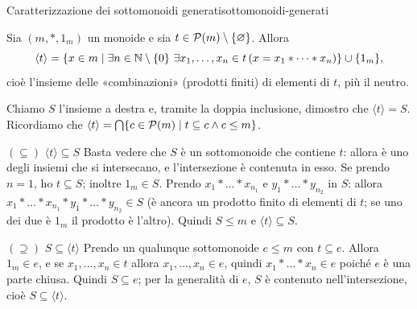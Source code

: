 \begin{concetto}
\begin{Teorema}{Caratterizzazione dei sottomonoidi generati}{sottomonoidi-generati}
    \begin{prerequisiti}
    \end{prerequisiti}
    Sia $(m, *, 1_m)$ un monoide e sia $t \in \mathcal{P}(m) \setminus \{\varnothing\}$. Allora
    \[ \langle t \rangle = \{x \in m \mid \exists n \in \mathbb{N} \setminus \{0\}\ \exists x_1, \dots, x_n \in t\,(x = x_1 * \dots * x_n)\} \cup \{1_m\}, \]
    cioè l'insieme delle «combinazioni» (prodotti finiti) di elementi di $t$, più il neutro.
\end{Teorema}
\begin{dimostrazione}
    Chiamo $S$ l'insieme a destra e, tramite la doppia inclusione, dimostro che $\langle t \rangle = S$. Ricordiamo che
    $\langle t \rangle = \bigcap\{c \in \mathcal{P}(m) \mid t \subseteq c \wedge c \leq m\}$.
    \begin{caso}{$(\subseteq)$ $\langle t \rangle \subseteq S$}
        Basta vedere che $S$ è un sottomonoide che contiene $t$: allora è uno degli insiemi che si intersecano, e l'intersezione
        è contenuta in esso.
        Se prendo $n = 1$, ho $t \subseteq S$; inoltre $1_m \in S$. Prendo $x_1 * \dots * x_{n_1}$ e $y_1 * \dots * y_{n_2}$ in $S$: allora
        $x_1 * \dots * x_{n_1} * y_1 * \dots * y_{n_2} \in S$ (è ancora un prodotto finito di elementi di $t$; se uno dei due è $1_m$ il prodotto
        è l'altro). Quindi $S \leq m$ e $\langle t \rangle \subseteq S$.
    \end{caso}
    \begin{caso}{$(\supseteq)$ $S \subseteq \langle t \rangle$}
        Prendo un qualunque sottomonoide $e \leq m$ con $t \subseteq e$. Allora $1_m \in e$, e se $x_1, \dots, x_n \in t$ allora
        $x_1, \dots, x_n \in e$, quindi $x_1 * \dots * x_n \in e$ poiché $e$ è una parte chiusa. Quindi $S \subseteq e$; per la generalità
        di $e$, $S$ è contenuto nell'intersezione, cioè $S \subseteq \langle t \rangle$.
    \end{caso}
\end{dimostrazione}
\end{concetto}

